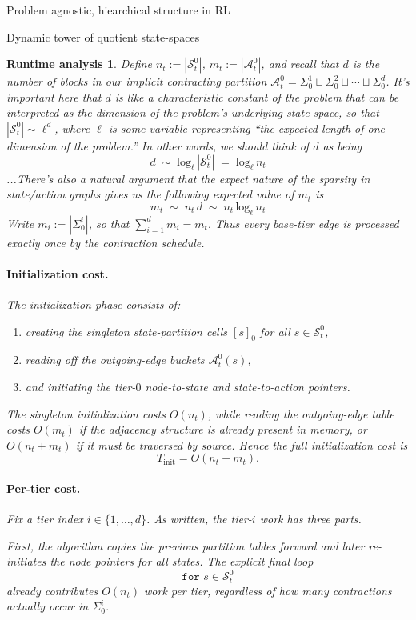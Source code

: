 \documentclass[11pt]{article}
\newtheorem{run_analysis}[subsubsection]{Runtime analysis}
\begin{document}
\begin{section}{Problem agnostic, hiearchical structure in RL}
\begin{subsection}{Dynamic tower of quotient state-spaces}
\begin{run_analysis}
Define
$
n_t:=|\mathcal{S}_t^0|$,
$
m_t:=|\mathcal{A}_t^0|$, and recall that $d$ is the number of blocks in our implicit contracting partition
$\mathcal{A}_t^0
=
\Sigma_0^1 \sqcup \Sigma_0^2 \sqcup \cdots \sqcup \Sigma_0^d
$.
It's important here that $d$ is like a characteristic constant of the problem that can be interpreted as the dimension of the problem's underlying state space, so that $|\mathcal{S}_t^0|\sim \ell^{d}$, where $\ell$ is some variable representing ``the expected length of one dimension of the problem.'' In other words, we should think of $d$ as being
\begin{equation}\label{eq: approx log}
d\;\sim\;\text{log}_{\ell}\,|\mathcal{S}_t^0|\;=\;\text{log}_{\ell}\,n_{t}
\end{equation}
...There's also a natural argument that the expect nature of the sparsity in state/action graphs gives us the following expected value of $m_{t}$ is
$$
m_{t}
\;\sim\;
n_{t}\,d
\;\sim\;
n_{t}\,\text{log}_{\ell}\,n_{t}
$$
Write
$
m_i:=|\Sigma_0^i|$, so that $\sum_{i=1}^d m_i=m_t.
$
Thus every base-tier edge is processed exactly once by the contraction schedule.

\paragraph{Initialization cost.}
The initialization phase consists of:
\begin{enumerate}
    \item creating the singleton state-partition cells $[s]_0$ for all $s\in\mathcal{S}_t^0$,
    \item reading off the outgoing-edge buckets $\mathcal{A}_t^0(s)$,
    \item and initiating the tier-$0$ node-to-state and state-to-action pointers.
\end{enumerate}
The singleton initialization costs $O(n_t)$, while reading the outgoing-edge table costs $O(m_t)$ if the adjacency structure is already present in memory, or $O(n_t+m_t)$ if it must be traversed by source. Hence the full initialization cost is
\[
T_{\mathrm{init}}=O(n_t+m_t).
\]

\paragraph{Per-tier cost.}
Fix a tier index $i\in\{1,\dots,d\}$. As written, the tier-$i$ work has three parts.

First, the algorithm copies the previous partition tables forward and later re-initiates the node pointers for all states. The explicit final loop
\[
\texttt{for }s\in\mathcal{S}_t^0
\]
already contributes $O(n_t)$ work per tier, regardless of how many contractions actually occur in $\Sigma_0^i$.


\end{run_analysis}
\end{subsection}
\end{section}
\end{document}
